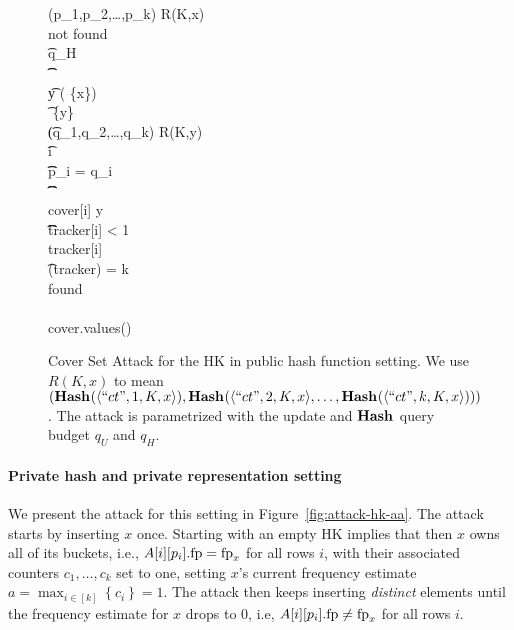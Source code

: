 \begin{figure*}[ht!]
\begin{pchstack}[boxed,center,space=0.5em]
\begin{pcvstack}[space=0.45em]
{			\\
			\\
			(p_1,p_2,\ldots,p_k) \gets R(K,x)\\
			\pcwhile \textrm{not found}\\
			\t \pcif q_H \ \HASHO{}\\
			\t \t \pcreturn \emptyset\\
			\t y \getsr {}\setminus ( \cup \{x\})\\
			\t \set{I} \gets {} \cup \{y\}\\
			\t (q_1,q_2,\ldots,q_k) \gets R(K,y)\\
			\t \pcfor i \in [k]\\
			\t \t \pcif p_i = q_i\\
			\t \t \t {}\\
			\t \t \t \textrm{cover}[i] \gets y\\
			\t \t \t \pcif \textrm{tracker}[i] < 1\\
			\t \t \t \t  \textrm{tracker}[i] \\
			\t \pcif {}(\textrm{tracker}) = k\\
			\t \t \textrm{found} \gets {}\\
			\\
			\pcreturn \textrm{cover.values()}
		}
	\end{pcvstack}
	\end{pchstack}
	\caption[Public Hash HK Attack.]{Cover Set Attack for the HK in public
		hash function setting. 
		We use $R(K,x)$ to mean $(\textup{\textbf{Hash}}\hspace{0.5pt}(\langle ``ct", 1,K,x \rangle),\textup{\textbf{Hash}}\hspace{0.5pt}(\langle ``ct", 2,K,x \rangle,\ldots,\textup{\textbf{Hash}}\hspace{0.5pt}(\langle ``ct", k,K,x \rangle)))$.
		The attack is parametrized with the update and $\textup{\textbf{Hash}}\hspace{0.5pt}$ query budget $q_U$ and $q_H$.
	}
	\label{fig:attack-hk-hfis}
\end{figure*}

\paragraph{Private hash and private representation setting}
We present the attack for this setting in Figure~\ref{fig:attack-hk-aa}.
The attack starts by inserting $x$ once. Starting with an empty HK implies that then $x$ owns all of its buckets, i.e., $A[i][p_i].\textup{fp} = \textup{fp}_x$ for all rows $i$, with their associated counters $c_1, \dots, c_k$ set to one, setting $x$'s current frequency estimate 
$a = \max_{{i \in [k]}} \left\{c_i\right\} = 1$. The attack then keeps inserting \textit{distinct} elements until the frequency estimate for $x$ drops to $0$, i.e, $A[i][p_i].\textup{fp} \not= \textup{fp}_x$ for all rows $i$.

